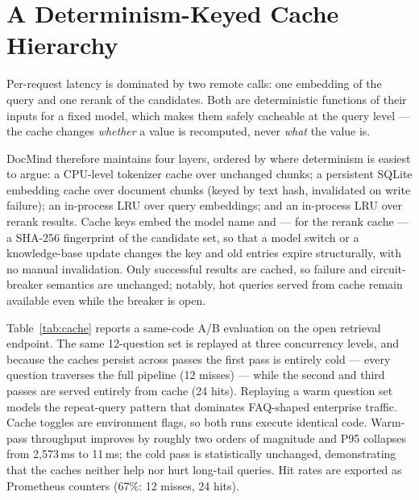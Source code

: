 \documentclass[11pt,a4paper]{article}
\begin{document}
\section{A Determinism-Keyed Cache Hierarchy}\label{sec:cache}

Per-request latency is dominated by two remote calls: one embedding of the query and
one rerank of the candidates. Both are deterministic functions of their inputs for a
fixed model, which makes them safely cacheable at the query level --- the cache changes
\emph{whether} a value is recomputed, never \emph{what} the value is.

DocMind therefore maintains four layers, ordered by where determinism is easiest to
argue: a CPU-level tokenizer cache over unchanged chunks; a persistent SQLite embedding
cache over document chunks (keyed by text hash, invalidated on write failure); an
in-process LRU over query embeddings; and an in-process LRU over rerank results. Cache
keys embed the model name and --- for the rerank cache --- a SHA-256 fingerprint of the
candidate set, so that a model switch or a knowledge-base update changes the key and
old entries expire structurally, with no manual invalidation. Only successful results
are cached, so failure and circuit-breaker semantics are unchanged; notably, hot
queries served from cache remain available even while the breaker is open.

Table~\ref{tab:cache} reports a same-code A/B evaluation on the open retrieval
endpoint. The same 12-question set is replayed at three concurrency levels, and because
the caches persist across passes the first pass is entirely cold --- every question
traverses the full pipeline (12 misses) --- while the second and third passes are
served entirely from cache (24 hits). Replaying a warm question set models the
repeat-query pattern that dominates FAQ-shaped enterprise traffic. Cache toggles are
environment flags, so both runs execute identical code. Warm-pass throughput improves
by roughly two orders of magnitude and P95 collapses from 2{,}573\,ms to 11\,ms; the
cold pass is statistically unchanged, demonstrating that the caches neither help nor
hurt long-tail queries. Hit rates are exported as Prometheus counters (67\%: 12
misses, 24 hits).
\end{document}
